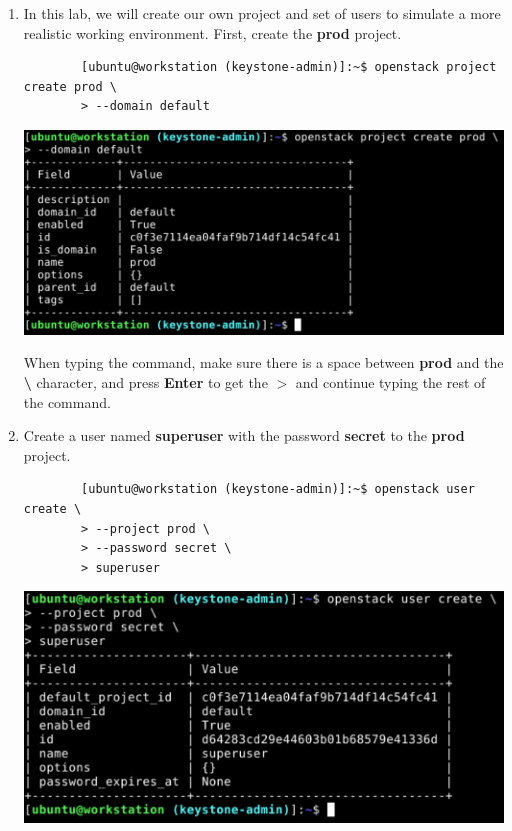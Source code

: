 \documentclass[letterpaper, 12pt]{article}
\begin{document}
\begin{enumerate}
    \item In this lab, we will create our own project and set of users to simulate a more realistic working environment.
    First, create the \textbf{prod} project.
    \begin{lstlisting}
        [ubuntu@workstation (keystone-admin)]:~$ openstack project create prod \
        > --domain default
    \end{lstlisting}

    \begin{center}
        \includegraphics[width=\linewidth]{images/part1/step4.png}
    \end{center}

    \begin{tipbox}
        When typing the command, make sure there is a space between \textbf{prod} and the \textbf{\textbackslash} character, and press \textbf{Enter} to get the \textbf{$>$} and continue typing the rest of the command.
    \end{tipbox}

    \item Create a user named \textbf{superuser} with the password \textbf{secret} to the \textbf{prod} project.
    \begin{lstlisting}
        [ubuntu@workstation (keystone-admin)]:~$ openstack user create \
        > --project prod \
        > --password secret \
        > superuser
    \end{lstlisting}

    \begin{center}
        \includegraphics[width=\linewidth]{images/part1/step5.png}
    \end{center}


\end{enumerate}
\end{document}
